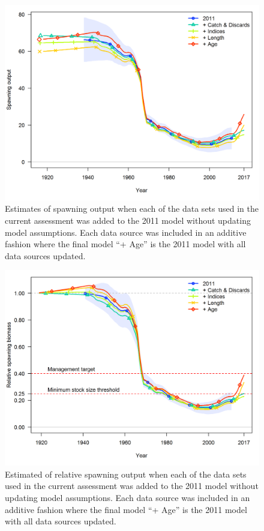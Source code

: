 \documentclass[12pt,]{article}
\begin{document}
\begin{figure}
\centering
\includegraphics{Figures/Data_spawnbio_uncertainty.png}
\caption{Estimates of spawning output when each of the data sets used in
the current assessment was added to the 2011 model without updating
model assumptions. Each data source was included in an additive fashion
where the final model ``+ Age'' is the 2011 model with all data sources
updated. \label{fig:data_ssb_update}}
\end{figure}

\FloatBarrier

\begin{figure}
\centering
\includegraphics{Figures/Data_Bratio_uncertainty.png}
\caption{Estimated of relative spawning output when each of the data
sets used in the current assessment was added to the 2011 model without
updating model assumptions. Each data source was included in an additive
fashion where the final model ``+ Age'' is the 2011 model with all data
sources updated. \label{fig:data_update}}
\end{figure}
\end{document}
